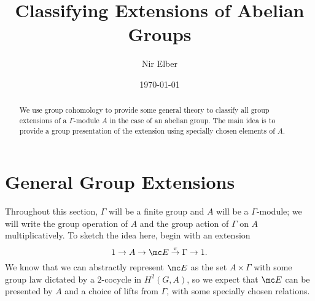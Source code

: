 \documentclass{article}
\title{Classifying Extensions of Abelian Groups}
\author{Nir Elber}
\date{\today}
\numberwithin{equation}{section}
\begin{document}
\maketitle

\begin{abstract}
	\noindent We use group cohomology to provide some general theory to classify all group extensions of a $\Gamma$-module $A$ in the case of an abelian group. The main idea is to provide a group presentation of the extension using specially chosen elements of $A$.
\end{abstract}

\setcounter{tocdepth}{4}
\tableofcontents

\section{General Group Extensions} \label{sec:general}
Throughout this section, $\Gamma$ will be a finite group and $A$ will be a $\Gamma$-module; we will write the group operation of $A$ and the group action of $\Gamma$ on $A$ multiplicatively. To sketch the idea here, begin with an extension
\[1\to A\to\mc E\stackrel\pi\to\Gamma\to1.\]
We know that we can abstractly represent $\mc E$ as the set $A\times\Gamma$ with some group law dictated by a $2$-cocycle in $H^2(G,A)$, so we expect that $\mc E$ can be presented by $A$ and a choice of lifts from $\Gamma$, with some specially chosen relations.
\end{document}
